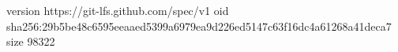 version https://git-lfs.github.com/spec/v1
oid sha256:29b5be48c6595eeaaed5399a6979ea9d226ed5147c63f16dc4a61268a41deca7
size 98322
